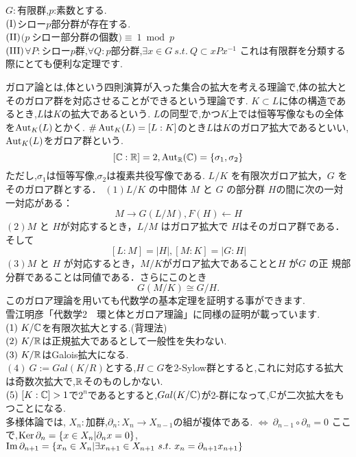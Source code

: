 \thm[シローの定理]
$G:$有限群,$p$:素数とする.\\
$\rm (I)$シロー$p$部分群が存在する.\\
$\rm (II)$$(p\ $シロー部分群の個数$)\equiv\ 1 \bmod p$\\
$\rm (III)$$\forall P:シローp$群,$\forall Q:p$部分群,$\exists x\in G\  s.t. \ Q\subset xPx^{-1}$
\thmx
これは有限群を分類する際にとても便利な定理です.

ガロア論とは,体という四則演算が入った集合の拡大を考える理論で,体の拡大とそのガロア群を対応させることができるという理論です.
$K \subset L$に体の構造であるとき,$L$は$K$の拡大であるという.
{}
$L$の同型で,かつ$K$上では恒等写像なもの全体を$\mathop{\mathrm{Aut}}\nolimits_K(L)$とかく.
$\# \mathop{\mathrm{Aut}}\nolimits_K(L)=[L:K]$のとき$L$は$K$のガロア拡大であるといい,$\mathop{\mathrm{Aut}}\nolimits_K(L)$をガロア群という.
\ex
\[
[\mathbb C:\mathbb R]=2,\mathop{\mathrm{Aut}}\nolimits_\mathbb R(\mathbb C) = \{\sigma_1,\sigma_2\}
\]
ただし,$\sigma_1$は恒等写像,$\sigma_2$は複素共役写像である.
\exx
\thm
$L/K$ を有限次ガロア拡大，$G$ をそのガロア群とする．
$(1)L/K$ の中間体 $M$ と $G$ の部分群 $H$の間に次の一対一対応がある：
\[
M \rightarrow G(L/M) , F(H) \leftarrow H
\]
$(2) M$ と $H $が対応するとき，$L/M$ はガロア拡大で $H$はそのガロア群である．
そして
\[
[L : M] = |H|, [M : K] = |G : H|
\]
$(3) M$ と $H$ が対応するとき，$M/K$がガロア拡大であることと$H$ が$G$ の正
規部分群であることは同値である．さらにこのとき
\[
G(M/K) \cong G/H. 
\]
\thmx
このガロア理論を用いても代数学の基本定理を証明する事ができます.
\proof[Galois理論による証明のポイント]
\leavevmode\\
雪江明彦「代数学2　環と体とガロア理論」に同様の証明が載っています.\\
$(1)\ K/\C$を有限次拡大とする.(背理法)\\
$(2)\ K/\R$は正規拡大であるとして一般性を失わない.\\
$(3)\ K/\mathbb R$はGalois拡大になる.\\
$(4)\ G:=Gal(K/R)$とする,$H\subset G$を2-Sylow群とすると,これに対応する拡大は奇数次拡大で,$\mathbb R$そのものしかない.\\
$(5)\ [K:\C]>1$で$2^n$であるとすると,$Gal(K/\mathbb C)$が2-群になって,$\mathbb C$が二次拡大をもつことになる.\\
\proofx
{}
多様体論では,
$X_n:$加群,$\partial_n:X_n\to X_{n-1}$の組が複体である.
$\iff\ \partial_{n-1} \circ \partial_{n} = 0$
{}
ここで,$\mathop{\mathrm{Ker}}\nolimits \partial_n =\{x\in X_n| \partial_n x = 0 \} $,\ $\Image \partial_{n+1} = \{ x_n \in X_n | \exists x_{n+1} \in X_{n+1} \ s.t. \ x_n = \partial_{n+1} x_{n+1}\}$\\
